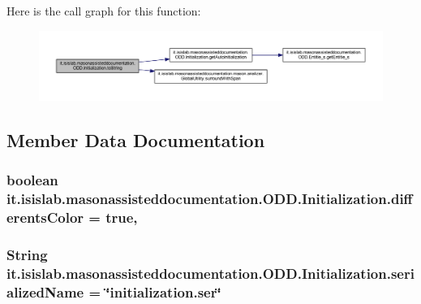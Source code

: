 Here is the call graph for this function\-:
\nopagebreak
\begin{figure}[H]
\begin{center}
\leavevmode
\includegraphics[width=350pt]{classit_1_1isislab_1_1masonassisteddocumentation_1_1_o_d_d_1_1_initialization_a161826a9181c7d87cbfcb7a9bc8bdc96_cgraph}
\end{center}
\end{figure}




\subsection{Member Data Documentation}
\hypertarget{classit_1_1isislab_1_1masonassisteddocumentation_1_1_o_d_d_1_1_initialization_a1db87b1c90cde4dc9bd028895fb3b6ca}{
\subsubsection[{differents\-Color}]{\setlength{\rightskip}{0pt plus 5cm}boolean it.\-isislab.\-masonassisteddocumentation.\-O\-D\-D.\-Initialization.\-differents\-Color = true\hspace{0.3cm}{\ttfamily [static]}, {\ttfamily [private]}}}\label{classit_1_1isislab_1_1masonassisteddocumentation_1_1_o_d_d_1_1_initialization_a1db87b1c90cde4dc9bd028895fb3b6ca}
\hypertarget{classit_1_1isislab_1_1masonassisteddocumentation_1_1_o_d_d_1_1_initialization_a68d6d76d36ac88da6784e304eb0c449d}{
\subsubsection[{serialized\-Name}]{\setlength{\rightskip}{0pt plus 5cm}String it.\-isislab.\-masonassisteddocumentation.\-O\-D\-D.\-Initialization.\-serialized\-Name = \char`\"{}initialization.\-ser\char`\"{}\hspace{0.3cm}{\ttfamily [static]}}}\label{classit_1_1isislab_1_1masonassisteddocumentation_1_1_o_d_d_1_1_initialization_a68d6d76d36ac88da6784e304eb0c449d}
